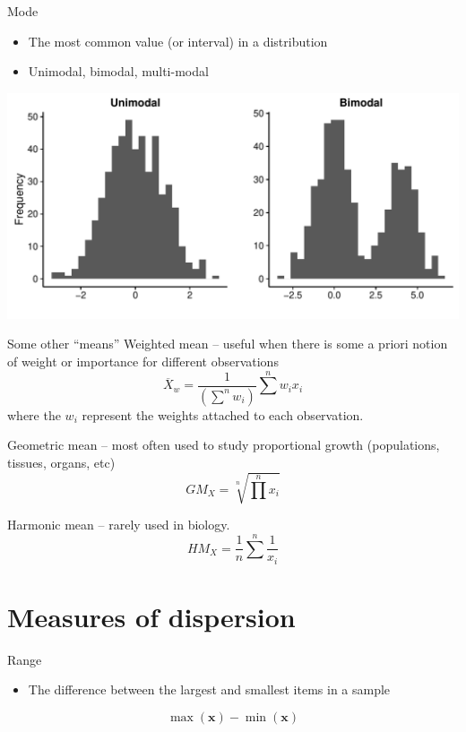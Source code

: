 \documentclass[presentation]{beamer}
\begin{document}
\begin{frame}[label={sec:orgheadline12}]{Mode}
\begin{itemize}
\item The most common value (or interval) in a distribution
\item Unimodal, bimodal, multi-modal
\end{itemize}

\includegraphics[width=.9\linewidth]{unimodal-and-bimodal.pdf}
\end{frame}

\begin{frame}[label={sec:orgheadline13}]{Some other ``means''}
\alert{Weighted mean} -- useful when there is some a priori notion of weight or importance for different observations
\[
\overline{X}_w = \frac{1}{(\sum^n w_i)} \sum^n w_i x_i
\]
where the \(w_i\) represent the weights attached to each observation.

\alert{Geometric mean} -- most often used to study proportional growth (populations, tissues, organs, etc)
\[
GM_X = \sqrt[n]{\prod^n x_i}
\]

\alert{Harmonic mean} -- rarely used in biology.
\[
HM_X = \frac{1}{n}\sum^n \frac{1}{x_i}
\]
\end{frame}



\section{Measures of dispersion}
\label{sec:orgheadline24}
\begin{frame}[label={sec:orgheadline15}]{Range}
\begin{itemize}
\item The difference between the largest and smallest items in a sample
\end{itemize}

\[
\max(\mathbf{x}) - \min(\mathbf{x})
\]
\end{frame}
\end{document}
